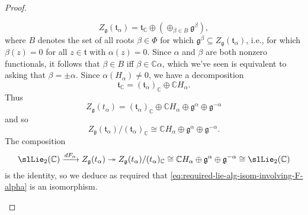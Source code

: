 \documentclass[reqno]{amsart} 
\begin{document}
\begin{proof}
\begin{enumerate}
    \begin{equation}\label{eq:}
      Z_{\mathfrak{g}}(\mathfrak{t}_\alpha)
      = \mathfrak{t}_{\mathbb{C}}
      \oplus (\oplus_{\beta \in B}
      \mathfrak{g}^\beta),
    \end{equation}
    where $B$ denotes the set of all roots $\beta \in \Phi$ for which $\mathfrak{g}^\beta \subseteq Z_{\mathfrak{g}}(\mathfrak{t}_\alpha)$, i.e., for which $\beta(z) = 0$ for all $z \in \mathfrak{t}$ with $\alpha(z) = 0$.  Since $\alpha$ and $\beta$ are both nonzero functionals, it follows that $\beta \in B$ iff $\beta \in \mathbb{C} \alpha$, which we've seen is equivalent to asking that $\beta = \pm \alpha$.  Since $\alpha(H_\alpha) \neq 0$, we have a decomposition
    \begin{equation}\label{eq:decompose-t-C-via-H-alpha}
      \mathfrak{t}_{\mathbb{C}} =
      (\mathfrak{t}_{\alpha})_{\mathbb{C}}
      \oplus \mathbb{C} H_\alpha.
    \end{equation}
    Thus
    \begin{equation}\label{eq:}
      Z_{\mathfrak{g}}(t_\alpha)
      = (\mathfrak{t}_\alpha)_{\mathbb{C}}
      \oplus \mathbb{C} H_\alpha
      \oplus \mathfrak{g}^{\alpha}
      \oplus \mathfrak{g}^{-\alpha}
    \end{equation}
    and so
    \begin{equation}\label{eq:}
      Z_{\mathfrak{g}}(\mathfrak{t}_\alpha)
      / (\mathfrak{t}_{\alpha})_{\mathbb{C}}
      \cong
      \mathbb{C} H_\alpha
      \oplus \mathfrak{g}^{\alpha} \oplus \mathfrak{g}^{-\alpha}.
    \end{equation}
    The composition
    \begin{equation}\label{eq:}
      \slLie_2(\mathbb{C}) \xrightarrow{d F_\alpha }
      Z_{\mathfrak{g}}(t_\alpha)
      \twoheadrightarrow Z_{\mathfrak{g}}(t_\alpha)/
      (t_\alpha)_{\mathbb{C}}
      \cong
      \mathbb{C} H_\alpha
      \oplus \mathfrak{g}^{\alpha} \oplus \mathfrak{g}^{-\alpha}
      \cong \slLie_2(\mathbb{C})
    \end{equation}
    is the identity, so we deduce as required that \eqref{eq:required-lie-alg-isom-involving-F-alpha} is an isomorphism.
  \end{enumerate}
\end{proof}
\end{document}
